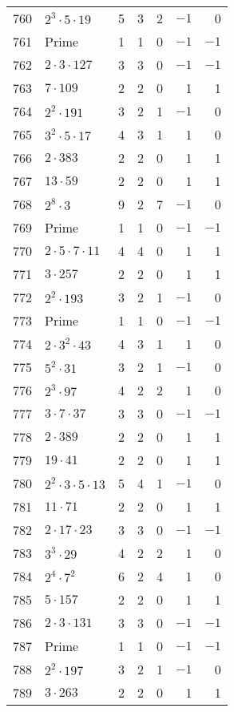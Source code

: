 \documentclass[12pt]{article}
\begin{document}
\begin{tabular}{|r|l|r|r|r|r|r|}
760 & $2^3 \cdot 5 \cdot 19$ & 5 & 3 & 2 & $-1$ & 0 \\
761 & Prime & 1 & 1 & 0 & $-1$ & $-1$ \\
762 & $2 \cdot 3 \cdot 127$ & 3 & 3 & 0 & $-1$ & $-1$ \\
763 & $7 \cdot 109$ & 2 & 2 & 0 & 1 & 1 \\
764 & $2^2 \cdot 191$ & 3 & 2 & 1 & $-1$ & 0 \\
765 & $3^2 \cdot 5 \cdot 17$ & 4 & 3 & 1 & 1 & 0 \\
766 & $2 \cdot 383$ & 2 & 2 & 0 & 1 & 1 \\
767 & $13 \cdot 59$ & 2 & 2 & 0 & 1 & 1 \\
768 & $2^8 \cdot 3$ & 9 & 2 & 7 & $-1$ & 0 \\
769 & Prime & 1 & 1 & 0 & $-1$ & $-1$ \\
770 & $2 \cdot 5 \cdot 7 \cdot 11$ & 4 & 4 & 0 & 1 & 1 \\
771 & $3 \cdot 257$ & 2 & 2 & 0 & 1 & 1 \\
772 & $2^2 \cdot 193$ & 3 & 2 & 1 & $-1$ & 0 \\
773 & Prime & 1 & 1 & 0 & $-1$ & $-1$ \\
774 & $2 \cdot 3^2 \cdot 43$ & 4 & 3 & 1 & 1 & 0 \\
775 & $5^2 \cdot 31$ & 3 & 2 & 1 & $-1$ & 0 \\
776 & $2^3 \cdot 97$ & 4 & 2 & 2 & 1 & 0 \\
777 & $3 \cdot 7 \cdot 37$ & 3 & 3 & 0 & $-1$ & $-1$ \\
778 & $2 \cdot 389$ & 2 & 2 & 0 & 1 & 1 \\
779 & $19 \cdot 41$ & 2 & 2 & 0 & 1 & 1 \\
780 & $2^2 \cdot 3 \cdot 5 \cdot 13$ & 5 & 4 & 1 & $-1$ & 0 \\
781 & $11 \cdot 71$ & 2 & 2 & 0 & 1 & 1 \\
782 & $2 \cdot 17 \cdot 23$ & 3 & 3 & 0 & $-1$ & $-1$ \\
783 & $3^3 \cdot 29$ & 4 & 2 & 2 & 1 & 0 \\
784 & $2^4 \cdot 7^2$ & 6 & 2 & 4 & 1 & 0 \\
785 & $5 \cdot 157$ & 2 & 2 & 0 & 1 & 1 \\
786 & $2 \cdot 3 \cdot 131$ & 3 & 3 & 0 & $-1$ & $-1$ \\
787 & Prime & 1 & 1 & 0 & $-1$ & $-1$ \\
788 & $2^2 \cdot 197$ & 3 & 2 & 1 & $-1$ & 0 \\
789 & $3 \cdot 263$ & 2 & 2 & 0 & 1 & 1 \\

\end{tabular}
\end{document}

